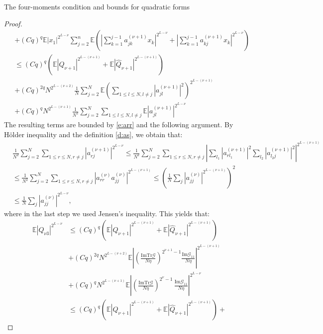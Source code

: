 \documentclass[11pt, a4paper, oneside]{book}
\numberwithin{equation}{chapter}
\newcommand{\E}{\mathbb E}
\newcommand{\Tr}{\mathrm{Tr}}
\begin{document}
\begin{section}{The four-moments condition and bounds for quadratic forms}
\begin{proof}
\begin{align}
 &+ (Cq)^q
 \E|x_1|^{2^{L-\nu}} \sum \limits_{j=2}^n
 \E\left( \left | \sum \limits_{k=1}^{j-1} a_{jk}^{(\nu+1)} x_k \right |^{2^{L-\nu}} + \left | \sum \limits_{k=1}^{j-1} a_{kj}^{(\nu+1)} x_k \right |^{2^{L-\nu}}\right) \nonumber
 \\
&\leq
 (Cq)^{q} \left ( \E |Q_{\nu+1} |^{2^{L-(\nu+1)}} + \E |\widehat{Q}_{\nu+1} |^{2^{L-(\nu+1)}} \right ) \nonumber \\
&+ (Cq)^{2q} N^{2^{L-(\nu+2)}} \frac{1}{N} \sum \limits_{j=2}^N \E\left ( \sum_{1\leq l\leq N, l \neq j} | a_{jl}^{(\nu+1)}|^2 \right )^{2^{L-(\nu+1)}} \nonumber
\\
&+ (Cq)^{q}  N^{2^{L-(\nu+1)}} \frac{1}{N^2} \sum \limits_{j=2}^N \sum_{1\leq l\leq N, l \neq j} \E | a_{jl}^{(\nu+1)} |^{2^{L-\nu}}
\end{align}
%
The resulting terms are bounded by \eqref{e:arr} and the following argument. By H\"older inequality and the definition \eqref{d:as}, we obtain that:
%
\begin{align} \label{e:arjhighpower}
&\frac{1}{N^2} \sum \limits_{j=2}^N \sum_{1\leq r\leq N, r\neq j}|a_{rj}^{(\nu+1)}|^{2^{L-\nu}} 
\leq
\frac{1}{N^2} \sum \limits_{j=2}^N  \sum_{1\leq r\leq N, r\neq j} \left|\sum_{l_1} |a_{r{l_1}}^{(\nu+1)}|^2 \sum_{l_2} |a_{{l_2}j}^{(\nu+1)}|^2\right|^{2^{L-(\nu+1)}}  \nonumber \\
 &\leq
  \frac{1}{N^2} \sum \limits_{j=2}^N  \sum_{1\leq r\leq N, r\neq j} \left|a_{rr}^{(\nu)}a_{jj}^{( \nu)}\right|^{2^{L-(\nu+1)}} \leq \left(\frac{1}{N}\sum_j |a_{jj}^{(\nu)}|^{2^{L-(\nu+1)}}\right)^2 \nonumber \\
 &\leq
    \frac{1}{N}\sum_j |a_{jj}^{(\nu)}|^{2^{L-\nu}} ,
\end{align}
%
where in the last step we used Jensen's inequality. This yields that:
%
\begin{align}
\E|Q_{\nu3}|^{2^{L-\nu}}
&\leq
(Cq)^{q} \left (\E |Q_{\nu+1} |^{2^{L-(\nu+1)}} + \E |\widehat{Q}_{\nu+1} |^{2^{L-(\nu+1)}} \right ) \nonumber
\\
&+
 (Cq)^{2q} N^{2^{L-(\nu+2)}} \E \left |  \left(\frac{\mathrm{Im} \Tr \mathcal{G}  }{N\eta}\right)^{2^{\nu+1}-1} \frac{\mathrm{Im} \mathcal{G}_{11} }{N\eta} \right |^{2^{L-(\nu+1)}} \nonumber \\
&+ (Cq)^{q}  N^{2^{L-(\nu+1)}} \E   \left|\left(\frac{\mathrm{Im} \Tr \mathcal{G}  }{N\eta}\right)^{2^{\nu}-1}\, \frac{\mathrm{Im} \mathcal{G}_{11} }{N\eta} 
\right|^{2^{L-\nu}} \nonumber
\\
&\leq
(Cq)^{q} \left (\E |Q_{\nu+1} |^{2^{L-(\nu+1)}} + \E |\widehat{Q}_{\nu+1} |^{2^{L-(\nu+1)}} \right )+

\end{align}
\end{proof}
\end{section}
\end{document}
